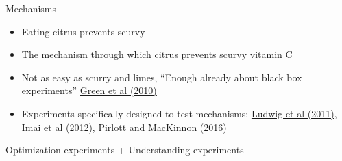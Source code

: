 \documentclass[aspectratio=169]{beamer}
\begin{document}
\begin{frame}

Mechanisms \pause
\begin{itemize}
\item Eating citrus prevents scurvy \pause
\item The mechanism through which citrus prevents scurvy vitamin C
\end{itemize}

\begin{itemize}
\item Not as easy as scurry and limes, ``Enough already about black box experiments''  \textcolor{blue}{\href{http://dx.doi.org/10.1177/0002716209351526}{Green et al (2010)}}
\pause
\item Experiments specifically designed to test mechanisms: \textcolor{blue}{\href{http://dx.doi.org/10.1257/jep.25.3.17}{Ludwig et al (2011)}}, \textcolor{blue}{\href{http://dx.doi.org/10.1111/j.1467-985X.2012.01032.x}{Imai et al (2012)}}, \textcolor{blue}{\href{http://dx.doi.org/10.1016/j.jesp.2015.09.012}{Pirlott and MacKinnon (2016)}}
\end{itemize}

\end{frame}
\begin{frame}

\Large{
\begin{center}
Optimization experiments + Understanding experiments
\end{center}
}

\end{frame}
\frame{\titlepage}
\end{document}
